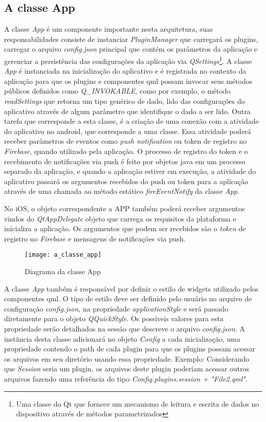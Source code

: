 \subsection{A classe App}\label{sec:solucao-desenvolvida}
A classe \textit{App} é um componente importante nesta arquitetura, suas responsabilidades consiste de instanciar \textit{PluginManager} que carregará os plugins, carregar o arquivo \textit{config.json} principal que contém os parâmetros da aplicação e gerenciar a persistência das configurações da aplicação via \textit{QSettings}\footnote{Uma classe do Qt que fornece um mecanismo de leitura e escrita de dados no dispositivo através de métodos parametrizados}. A classe \textit{App} é instanciada na inicialização do aplicativo e é registrada no contexto da aplicação para que os plugins e componentes qml possam invocar seus métodos públicos definidos como \textit{Q\_INVOKABLE}, como por exemplo, o método \textit{readSettings} que retorna um tipo genérico de dado, lido das configurações do aplicativo através de algum parâmetro que identifique o dado a ser lido. Outra tarefa que corresponde a esta classe, é a criação de uma conexão com a atividade do aplicativo no android, que corresponde a uma classe. Essa atividade poderá receber parâmetros de eventos como \textit{push notification} ou token de registro no \textit{Firebase}, quando utilizado pela aplicação. O processo de registro do token e o recebimento de notificações via push é feito por objetos java em um processo separado da aplicação, e quando a aplicação estiver em execução, a atividade do aplicativo passará os argumentos recebidos do push ou token para a aplicação através de uma chamada ao método estático \textit{fireEventNotify} da classe \textit{App}.\par

No iOS, o objeto correspondente a APP também poderá receber argumentos vindos do \textit{QtAppDelegate} objeto que carrega os requisitos da plataforma e inicializa a aplicação. Os argumentos que podem ser recebidos são o \textit{token} de registro no \textit{Firebase} e mensagens de notificações via push.

\begin{figure}[h]
	\texttt{[image: a\_classe\_app]}
	\centering
	\caption{Diagrama da classe App}
\end{figure}

A classe \textit{App} também é responsável por definir o estilo de widgets utilizado pelos componentes qml. O tipo de estilo deve ser definido pelo usuário no arquivo de configuração \textit{config.json}, na propriedade \textit{applicationStyle} e será passado diretamente para o objeto \textit{QQuickStyle}. Os possíveis valores para esta propriedade serão detalhados na sessão que descreve o arquivo \textit{config.json}. A instãncia desta classe adicionará no objeto \textit{Config} a cada inicialização, uma propriedade contendo o path de cada plugin para que os plugins possam acessar os arquivos em seu diretório usando essa propriedade. Exemplo: Considerando que \textit{Session} seria um plugin, os arquivos deste plugin poderiam acessar outros arquivos fazendo uma referência do tipo \textit{Config.plugins.session + "File2.qml"}.


